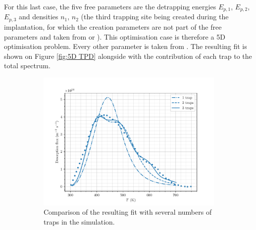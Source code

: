 For this last case, the five free parameters are the detrapping energies $E_{p, 1}$, $E_{p, 2}$, $E_{p, 3}$ and densities $n_1$, $n_2$ (the third trapping site being created during the implantation, for which the creation parameters are not part of the free parameters and taken from  or ).
This optimisation case is therefore a 5D optimisation problem.
Every other parameter is taken from .
The resulting fit is shown on Figure \ref{fig:5D TPD} alongside with the contribution of each trap to the total spectrum.
\begin{figure} [ht]
    \centering
        \begin{subfigure}[t]{0.5\linewidth}
            \centering
            \captionsetup{width=.9\linewidth}
            \includegraphics[width=\linewidth]{Figures/Chapter3/Parametric_optimisation/number_of_traps.pdf}
            \caption{Comparison of the resulting fit with several numbers of traps in the simulation.}
            \label{fig:number of traps comparison}
        \end{subfigure}%
        \begin{subfigure}[t]{0.5\linewidth}
            \centering
            \captionsetup{width=.9\linewidth}

\end{subfigure}
\end{figure}
